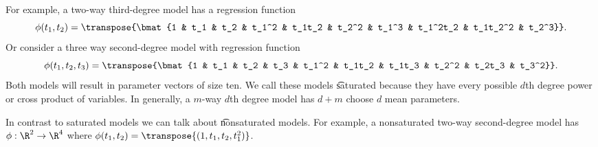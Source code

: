 For example, a two-way third-degree model has a regression function
    \[
\phi (t_1, t_2) = \transpose{\bmat{1 & t_1 & t_2 & t_1^2 & t_1t_2 & t_2^2 & t_1^3 & t_1^2t_2 & t_1t_2^2 & t_2^3}}.
    \]
Or consider a three way second-degree model with regression function
    \[
\phi (t_1, t_2, t_3) = \transpose{\bmat{1 & t_1 & t_2 & t_3 & t_1^2 & t_1t_2 & t_1t_3 & t_2^2 & t_2t_3 & t_3^2}}.
    \]
Both models will result in parameter vectors of size ten.
We call these models \t{saturated} because they have every possible $d$th degree power or cross product of variables.
In generally, a $m$-way $d$th degree model has $d+m$ choose $d$ mean parameters.

In contrast to saturated models we can talk about \t{nonsaturated} models.
For example, a nonsaturated two-way second-degree model has $\phi : \R ^2 \to \R ^4$ where $\phi (t_1, t_2) = \transpose{(1 , t_1 , t_2 , t_1^2)}$.
